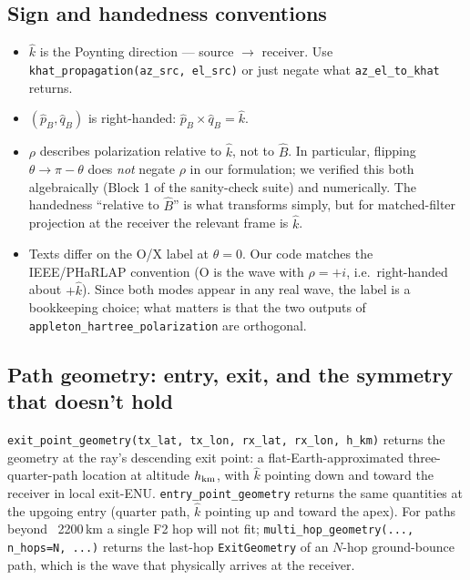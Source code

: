 \documentclass[11pt]{article}
\begin{document}
\subsection{Sign and handedness conventions}

\begin{itemize}\itemsep=2pt
\item $\hat k$ is the Poynting direction --- source $\to$ receiver.
      Use \texttt{khat\_propagation(az\_src, el\_src)} or just negate
      what \texttt{az\_el\_to\_khat} returns.
\item $(\hat p_B, \hat q_B)$ is right-handed:
      $\hat p_B \times \hat q_B = \hat k$.
\item $\rho$ describes polarization relative to $\hat k$, not to
      $\hat B$.  In particular, flipping $\theta \to \pi - \theta$
      does \emph{not} negate $\rho$ in our formulation; we verified
      this both algebraically (Block 1 of the sanity-check suite) and
      numerically.  The handedness ``relative to $\hat B$'' is what
      transforms simply, but for matched-filter projection at the
      receiver the relevant frame is $\hat k$.
\item Texts differ on the O/X label at $\theta = 0$.  Our code matches
      the IEEE/PHaRLAP convention (O is the wave with $\rho = +i$,
      i.e.\ right-handed about $+\hat k$).  Since both modes appear in
      any real wave, the label is a bookkeeping choice; what matters
      is that the two outputs of \texttt{appleton\_hartree\_polarization}
      are orthogonal.
\end{itemize}

\subsection{Path geometry: entry, exit, and the symmetry that doesn't hold}

\texttt{exit\_point\_geometry(tx\_lat, tx\_lon, rx\_lat, rx\_lon, h\_km)}
returns the geometry at the ray's descending exit point: a
flat-Earth-approximated three-quarter-path location at altitude
$h_{\rm km}$, with $\hat k$ pointing down and toward the receiver in
local exit-ENU.  \texttt{entry\_point\_geometry} returns the same
quantities at the upgoing entry (quarter path, $\hat k$ pointing up
and toward the apex).  For paths beyond ~2200\,km a single F2 hop
will not fit; \texttt{multi\_hop\_geometry(..., n\_hops=N, ...)}
returns the last-hop \texttt{ExitGeometry} of an $N$-hop ground-bounce
path, which is the wave that physically arrives at the receiver.
\end{document}
